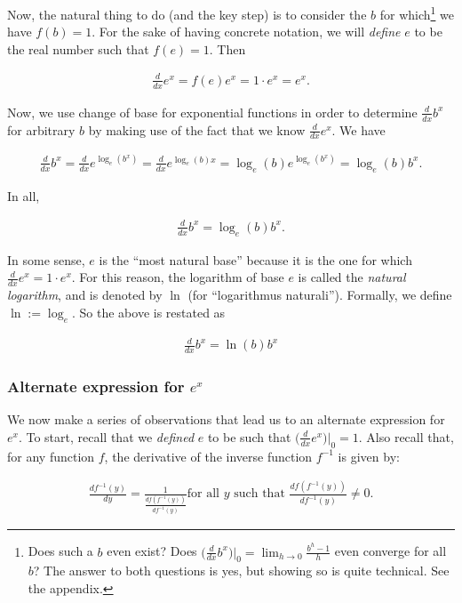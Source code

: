 Now, the natural thing to do (and the key step) is to consider the $b$ for which\footnote{Does such a $b$ even exist? Does $\Big( \frac{d}{dx} b^x \Big)\Big|_0 = \lim_{h \rightarrow 0} \frac{b^h - 1}{h}$ even converge for all $b$? The answer to both questions is yes, but showing so is quite technical. See the appendix.} we have $f(b) = 1$. For the sake of having concrete notation, we will \textit{define} $e$ to be the real number such that $f(e) = 1$. Then

\begin{align*}
    \frac{d}{dx} e^x = f(e) e^x = 1 \cdot e^x = e^x.
\end{align*}

Now, we use change of base for exponential functions in order to determine $\frac{d}{dx} b^x$ for arbitrary $b$ by making use of the fact that we know $\frac{d}{dx} e^x$. We have

\begin{align*}
    \frac{d}{dx} b^x = \frac{d}{dx} e^{\log_e(b^x)} = \frac{d}{dx} e^{\log_e(b) x} = \log_e(b) e^{\log_e(b^x)} = \log_e(b) b^x.
\end{align*}

In all,

\begin{align*}
    \frac{d}{dx} b^x = \log_e(b) b^x.
\end{align*}

In some sense, $e$ is the ``most natural base'' because it is the one for which $\frac{d}{dx} e^x = 1 \cdot e^x$. For this reason, the logarithm of base $e$ is called the \textit{natural logarithm}, and is denoted by $\ln$ (for ``logarithmus naturali''). Formally, we define $\ln := \log_e$. So the above is restated as

\begin{align*}
    \boxed
    {
        \frac{d}{dx} b^x = \ln(b) b^x
    }
\end{align*}

\subsubsection*{Alternate expression for $e^x$}

We now make a series of observations that lead us to an alternate expression for $e^x$. To start, recall that we \textit{defined} $e$ to be such that $\Big( \frac{d}{dx} e^x \Big)\Big|_0 = 1$. Also recall that, for any function $f$, the derivative of the inverse function $f^{-1}$ is given by:

\begin{align*}
    \frac{df^{-1}(y)}{dy} = \frac{1}{\frac{df(f^{-1}(y))}{df^{-1}(y)}} \text{for all $y$ such that $\frac{df(f^{-1}(y))}{df^{-1}(y)} \neq 0$}.
\end{align*}

